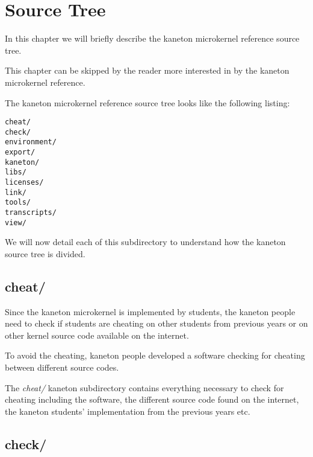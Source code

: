 
%
%

\chapter{Source Tree}

In this chapter we will briefly describe the kaneton microkernel reference
source tree.

This chapter can be skipped by the reader more interested in by the
kaneton microkernel reference.

\newpage

%
%

The kaneton microkernel reference source tree looks like the following
listing:

\begin{verbatim}
cheat/
check/
environment/
export/
kaneton/
libs/
licenses/
link/
tools/
transcripts/
view/
\end{verbatim}

We will now detail each of this subdirectory to understand how the
kaneton source tree is divided.

%
%

\section{cheat/}

Since the kaneton microkernel is implemented by students, the kaneton
people need to check if students are cheating on other students from
previous years or on other kernel source code available on the internet.

To avoid the cheating, kaneton people developed a software checking
for cheating between different source codes.

The \textit{cheat/} kaneton subdirectory contains everything necessary
to check for cheating including the software, the different source code
found on the internet, the kaneton students' implementation from the
previous years etc.

%
%

\section{check/}

